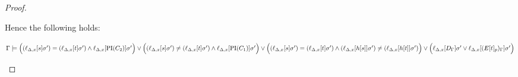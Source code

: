 \documentclass[,%
	paper=a4,%
	DIV14, 
	liststotoc,
	bibtotoc,
	draft=false,%
	numbers=noendperiod
]{scrartcl}
\newcommand{\lif}[1]{\lift{\Delta}{#1}{x}}
\begin{document}
\begin{proof}
\begin{description}
\begin{enumerate}
\begin{comment}
					Otherwise position $p$ is in a maximal $\Delta$-term $h\occurat{t}{q}$, such that $h\occurat{t}{q}$ and $h\occurat{s}{q}$ are replaced with distinct variables.
					But then clearly $\lif{h\occurat{s}{q}} \neq \lif{h\occurat{t}{q}}$.
				\end{proof}

				\end{comment}
 Hence the following holds:

				$\Gamma \entails
				\Big((\lif{s}\sigma')=(\lif{t}\sigma') \land \lif{\PI(C_2)}\sigma'\Big) \lor
				\Big((\lif{s}\sigma')\neq(\lif{t}\sigma') \land \lif{\PI(C_1)}\sigma'\Big) \lor
				\Big((\lif{s}\sigma')=(\lif{t}\sigma') \land (\lif{h\occur{s}}\sigma') \neq (\lif{h\occur{t}}\sigma' )\Big) \lor
				\Big(\lif{D_\Gamma}\sigma' \lor \lif{(E\occurat{t}{p})_\Gamma}\sigma'\Big)$
				\qedhere
		\end{enumerate}


		\begin{comment}



			easy case:
			$\PI(C) = [ ( s=t \land \PI(C_2) ) \lor (s\neq t \land \PI(C_1)) ]\sigma$

			to show:
			$\Gamma \entails \lif{ [ (( s=t \land \PI(C_2) ) \lor (s\neq t \land \PI(C_1))) \lor (D \lor E[t]) ]\sigma} $

			proof idea: either $s=t$, then also $\PI(C_2)$, or else $s\neq t$, but then also $\PI(C_1)$

			by lemma \ref{lemma:lif} for $\sigma'$ as in lemma, 
			$\Gamma \entails \lif{ (( s=t \land \PI(C_2) ) \lor (s\neq t \land \PI(C_1))) \lor (D \lor E[t]) }\sigma' $

			by lemma 11 (huang)
			$\Gamma \entails [((\lif{s}=\lif{t} \land \lif{\PI(C_2)} ) \lor (\lif{s\neq t} \land \lif{\PI(C_1)})) \lor (\lif{D} \lor \lif{E[t]}) ]\sigma' $

			reformulate:
			$\Gamma \entails ((\lif{s}\sigma'=\lif{t}\sigma' \land \lif{\PI(C_2)}\sigma' ) \lor (\lif{s}\sigma'\neq \lif{t}\sigma' \land \lif{\PI(C_1)}\sigma')) \lor (\lif{D}\sigma' \lor \lif{E[t]}\sigma') $

			By the rule: $s\sigma = r\sigma$, hence also $\lif{s\sigma} = \lif{r\sigma}$ and $\lif{s}\sigma' = \lif{r}\sigma'$ REALLY TRUE? -- think so\dots

			Suppose $M \entails \Gamma$ and $M \not \entails (\lif{D}\sigma' \lor \lif{E[t]}\sigma') $.

			Suppose $M \entails \lif{s}\sigma' = \lif{t}\sigma'$.


\end{comment}
\end{description}
\end{proof}
\end{document}
